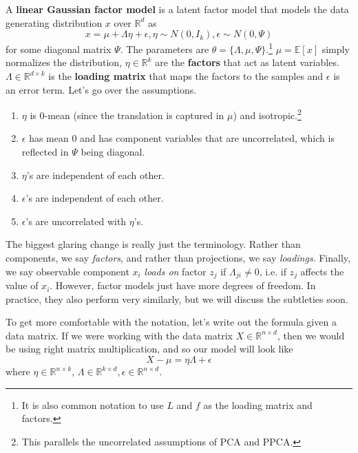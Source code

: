   \begin{definition} 
    A \textbf{linear Gaussian factor model} is a latent factor model that models the data generating distribution $x$ over $\mathbb{R}^d$ as 
    \begin{equation}
      x = \mu + \Lambda \eta + \epsilon, \eta \sim N(0, I_k), \epsilon \sim N(0, \Psi)
    \end{equation}
    for some diagonal matrix $\Psi$. The parameters are $\theta = \{\Lambda, \mu, \Psi\}$.\footnote{It is also common notation to use $L$ and $f$ as the loading matrix and factors.} $\mu = \mathbb{E}[x]$ simply normalizes the distribution, $\eta \in \mathbb{R}^k$ are the \textbf{factors} that act as latent variables. $\Lambda \in \mathbb{R}^{d \times k}$ is the \textbf{loading matrix} that maps the factors to the samples and $\epsilon$ is an error term. 
    Let's go over the assumptions. 
    \begin{enumerate}
      \item  $\eta$ is $0$-mean (since the translation is captured in $\mu$) and isotropic.\footnote{This parallels the uncorrelated assumptions of PCA and PPCA.}
      \item $\epsilon$ has mean $0$ and has component variables that are uncorrelated, which is reflected in $\Psi$ being diagonal.
      \item $\eta$'s are independent of each other. 
      \item $\epsilon$'s are independent of each other. 
      \item $\epsilon$'s are uncorrelated with $\eta$'s. 
    \end{enumerate}
  \end{definition} 

  The biggest glaring change is really just the terminology. Rather than components, we say \textit{factors}, and rather than projections, we say \textit{loadings}. Finally, we say observable component $x_i$ \textit{loads on} factor $z_j$ if $\Lambda_{ji} \neq 0$, i.e. if $z_j$ affects the value of $x_i$. However, factor models just have more degrees of freedom. In practice, they also perform very similarly, but we will discuss the subtleties soon. 

  To get more comfortable with the notation, let's write out the formula given a data matrix. If we were working with the data matrix $X \in \mathbb{R}^{n \times d}$, then we would be using right matrix multiplication, and so our model will look like 
  \begin{equation}
    X - \mu = \eta \Lambda + \epsilon
  \end{equation}
  where $\eta \in \mathbb{R}^{n \times k}$, $\Lambda \in \mathbb{R}^{k \times d}, \epsilon \in \mathbb{R}^{n \times d}$. 

